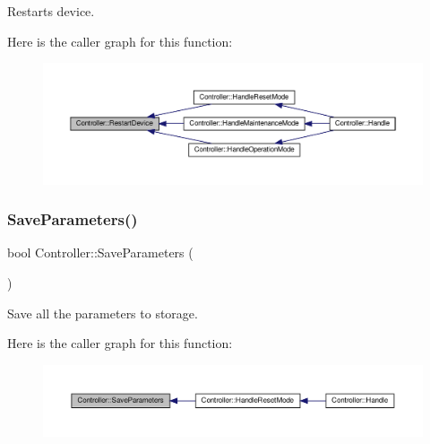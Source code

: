 Restarts device. 

Here is the caller graph for this function\+:
\nopagebreak
\begin{figure}[H]
\begin{center}
\leavevmode
\includegraphics[width=350pt]{classController_a99d30681a2e92b92098745e6a3608d10_icgraph}
\end{center}
\end{figure}
\mbox{\label{classController_a718a2ae64edc1376a69d9dc08fa0ed44}} 
\subsubsection{\texorpdfstring{Save\+Parameters()}{SaveParameters()}}
{\footnotesize\ttfamily bool Controller\+::\+Save\+Parameters (\begin{DoxyParamCaption}{ }\end{DoxyParamCaption})\hspace{0.3cm}{\ttfamily [private]}}



Save all the parameters to storage. 

Here is the caller graph for this function\+:
\nopagebreak
\begin{figure}[H]
\begin{center}
\leavevmode
\includegraphics[width=350pt]{classController_a718a2ae64edc1376a69d9dc08fa0ed44_icgraph}
\end{center}
\end{figure}
\mbox{\label{classController_ac462515d6845e176608cecf75c696eac}} 
